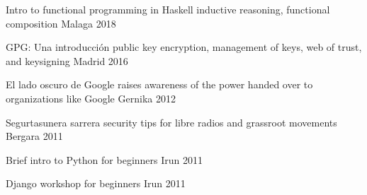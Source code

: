 \documentclass[11pt, a4paper]{awesome-cv}
\begin{document}

\begin{cvhonors}
    \cvhonor
      {Intro to functional programming in Haskell}
      {inductive reasoning, functional composition}
      {Malaga} %
      {2018} %

    \cvhonor
      {GPG: Una introducción}
      {public key encryption, management of keys, web of trust, and keysigning}
      {Madrid} %
      {2016} %

    \cvhonor
      {El lado oscuro de Google} %
      {raises awareness of the power handed over to organizations like Google}
      {Gernika}
      {2012}
  
    \cvhonor
      {Segurtasunera sarrera} %
      {security tips for libre radios and grassroot movements}
      {Bergara} %
      {2011} %
  
    \cvhonor
      {Brief intro to Python}
      {for beginners}
      {Irun}
      {2011}

    \cvhonor
      {Django workshop}
      {for beginners}
      {Irun}
      {2011}
\end{cvhonors}
\end{document}

